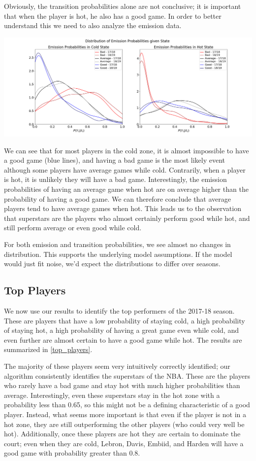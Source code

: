 \documentclass[12pt, authoryear]{elsarticle}
\begin{document}
Obviously, the transition probabilities alone are not conclusive; it is important that when the player is hot, he also has a good game. In order to better understand this we need to also analyze the emission data. 

\includegraphics[scale=0.35]{emission_probs}

We can see that for most players in the cold zone, it is almost impossible to have a good game (blue lines), and having a bad game is the most likely event although some players have average games while cold. Contrarily, when a player is hot, it is unlikely they will have a bad game. Interestingly, the emission probabilities of having an average game when hot are on average higher than the probability of having a good game. We can therefore conclude that average players tend to have average games when hot. This leads us to the observation that superstars are the players who almost certainly perform good while hot, and still perform average or even good while cold.

For both emission and transition probabilities, we see almost no changes in distribution. This supports the underlying model assumptions. If the model would just fit noise, we'd expect the distributions to differ over seasons. 

\subsection{Top Players}

We now use our results to identify the top performers of the 2017-18 season. These are players that have a low probability of staying cold, a high probability of staying hot, a high probability of having a great game even while cold, and even further are almost certain to have a good game while hot. The results are summarized in \ref{top_players}.

The majority of these players seem very intuitively correctly identified; our algorithm consistently identifies the superstars of the NBA. These are the players who rarely have a bad game and stay hot with much higher probabilities than average. Interestingly, even these superstars stay in the hot zone with a probability less than 0.65, so this might not be a defining characteristic of a good player. Instead, what seems more important is that even if the player is not in a hot zone, they are still outperforming the other players (who could very well be hot). Additionally, once these players are hot they are certain to dominate the court; even when they are cold, Lebron, Davis, Embiid, and Harden will have a good game with probability greater than 0.8.
 
\end{document}
